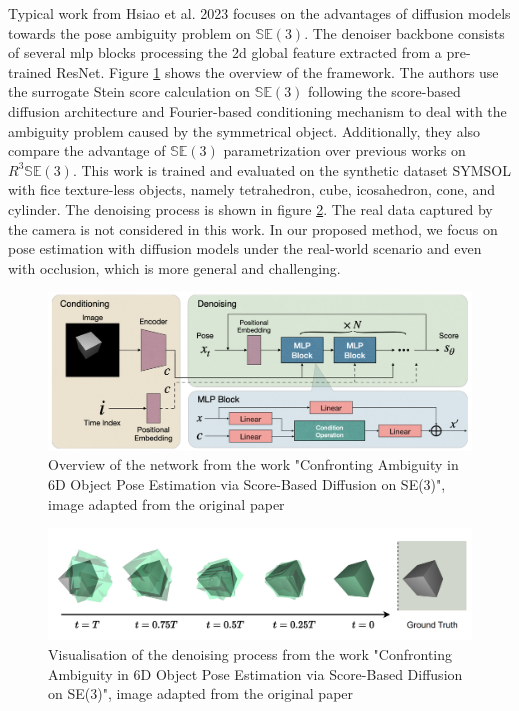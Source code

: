 \documentclass[12pt,DIV14,BCOR12mm,a4paper,footinclude=false,headinclude,parskip=half-,twoside,openright,cleardoublepage=empty,toc=index,bibliography=totoc,listof=totoc]{scrreprt}
\numberwithin{equation}{chapter}
\begin{document}
Typical work from Hsiao et al. 2023 \cite{hsiao2023confronting} focuses on the advantages of diffusion models towards the pose ambiguity problem on $\mathbb{SE}(3)$. The denoiser backbone consists of several \gls{mlp} blocks processing the \gls{2d} global feature extracted from a pre-trained ResNet. Figure \ref{img:confront} shows the overview of the framework. The authors use the surrogate Stein score calculation on $\mathbb{SE}(3)$ following the score-based diffusion architecture and Fourier-based conditioning mechanism to deal with the ambiguity problem caused by the symmetrical object. Additionally, they also compare the advantage of $\mathbb{SE}(3)$ parametrization over previous works on $R^{3}\mathbb{SE}(3)$. This work is trained and evaluated on the synthetic dataset SYMSOL \cite{implicitpdf2021} with fice texture-less objects, namely tetrahedron, cube, icosahedron, cone, and cylinder. The denoising process is shown in figure \ref{img:confront_cube}. The real data captured by the camera is not considered in this work. In our proposed method, we focus on pose estimation with diffusion models under the real-world scenario and even with occlusion, which is more general and challenging.
\begin{figure}[h]
	\centering
	\includegraphics[width=1.\textwidth]{img/confront.png}
	\caption{Overview of the network from the work "Confronting Ambiguity in 6D Object Pose Estimation via Score-Based Diffusion on SE(3)", image adapted from the original paper \cite{hsiao2023confronting}}
	\label{img:confront}
\end{figure}

\begin{figure}[h]
	\centering
	\includegraphics[width=1.\textwidth]{img/confront_cube.png}
	\caption{Visualisation of the denoising process from the work "Confronting Ambiguity in 6D Object Pose Estimation via Score-Based Diffusion on SE(3)", image adapted from the original paper \cite{hsiao2023confronting}}
	\label{img:confront_cube}
\end{figure}
\end{document}
